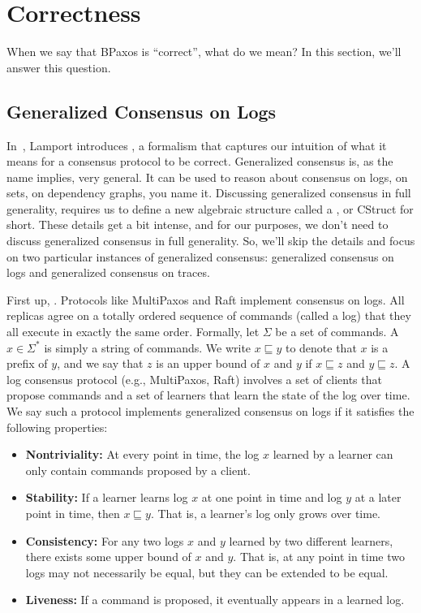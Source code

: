 \section{Correctness}
When we say that BPaxos is ``correct'', what do we mean? In this section, we'll
answer this question.

\subsection{Generalized Consensus on Logs}
In~\cite{lamport2005generalized}, Lamport introduces , a formalism that captures our intuition of what it means for a
consensus protocol to be correct. Generalized consensus is, as the name
implies, very general. It can be used to reason about consensus on logs, on
sets, on dependency graphs, you name it. Discussing generalized consensus in
full generality, requires us to define a new algebraic structure called a
, or CStruct for short. These details get a bit
intense, and for our purposes, we don't need to discuss generalized consensus
in full generality. So, we'll skip the details and focus on two particular
instances of generalized consensus: generalized consensus on logs and
generalized consensus on traces.

\newcommand{\Cmd}{\Sigma}
\newcommand{\prefixof}{\sqsubseteq}
First up, . Protocols like MultiPaxos
and Raft implement consensus on logs. All replicas agree on a totally ordered
sequence of commands (called a log) that they all execute in exactly the same
order. Formally, let $\Cmd$ be a set of commands. A  $x \in
\Cmd^*$ is simply a string of commands. We write $x \prefixof y$ to denote that
$x$ is a prefix of $y$, and we say that $z$ is an upper bound of $x$ and $y$ if
$x \prefixof z$ and $y \prefixof z$. A log consensus protocol (e.g.,
MultiPaxos, Raft) involves a set of clients that propose commands and a set of
learners that learn the state of the log over time. We say such a protocol
implements generalized consensus on logs if it satisfies the following
properties:
\begin{itemize}
  \item \textbf{Nontriviality:}
    At every point in time, the log $x$ learned by a learner can only contain
    commands proposed by a client.

  \item \textbf{Stability:}
    If a learner learns log $x$ at one point in time and log $y$ at a later
    point in time, then $x \prefixof y$. That is, a learner's log only grows
    over time.

  \item \textbf{Consistency:}
    For any two logs $x$ and $y$ learned by two different learners, there
    exists some upper bound of $x$ and $y$. That is, at any point in time two
    logs may not necessarily be equal, but they can be extended to be equal.

  \item \textbf{Liveness:}
    If a command is proposed, it eventually appears in a learned log.
\end{itemize}

